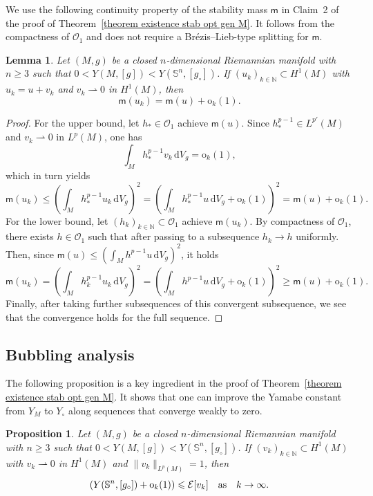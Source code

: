 \documentclass[reqno,11pt]{amsart}
\numberwithin{equation}{section}
\newtheorem{lemma}[theorem]{Lemma}
\newtheorem{proposition}[theorem]{Proposition}
\theoremstyle{definition}
\theoremstyle{remark}
\newcommand{\ud}{\,\mathrm{d}}
\newcommand{\Ss}{\mathbb{S}}
\begin{document}
We use the following continuity property of the stability mass $\mathsf{m}$ in Claim~2 of the proof of Theorem~\ref{theorem existence stab opt gen M}. It follows from the compactness of $\mathscr{O}_1$ and does not require a Br\'ezis--Lieb-type splitting for $\mathsf{m}$.

\begin{lemma}
\label{lemma m continuity}
Let $(M,g)$ be a closed $n$-dimensional Riemannian manifold with $n \geqslant 3$ 
such that $0 < Y(M,[g]) < Y(\Ss^n,[g_\circ])$.
If $(u_k)_{k \in \mathbb{N}} \subset H^1(M)$ with $u_k = u + v_k$
and $v_k \rightharpoonup 0$ in $H^1(M)$, then
\[
\mathsf{m}(u_k) = \mathsf{m}(u) + \mathrm{o}_k(1).
\]
\end{lemma}

\begin{proof}
For the upper bound, let $h_* \in \mathscr{O}_1$ achieve $\mathsf{m}(u)$. Since $h_*^{p-1} 
\in L^{p'}(M)$ and $v_k \rightharpoonup 0$ in $L^p(M)$, one has 
\[
\int_M h_*^{p-1} v_k \ud V_g =\mathrm{o}_k(1), 
\]
which in turn yields
\[
\mathsf{m}(u_k) \leqslant \left(\int_M h_*^{p-1} u_k \ud V_g\right)^2 = \left(\int_M h_*^{p-1} u 
\ud V_g + \mathrm{o}_k(1)\right)^2 = \mathsf{m}(u) + \mathrm{o}_k(1).
\]
For the lower bound, let $(h_k)_{k \in \mathbb{N}} \subset \mathscr{O}_1$ achieve 
$\mathsf{m}(u_k)$. By compactness of $\mathscr{O}_1$, there exists $h \in \mathscr{O}_1$ 
such that after passing to a subsequence $h_k \to h$ uniformly. Then, since $\mathsf{m}(u) \leqslant (\int_M h^{p-1} u \ud V_g)^2$, it holds
\[
\mathsf{m}(u_k) = \left(\int_M h_k^{p-1} u_k \ud V_g\right)^2 = \left(\int_M h^{p-1} u 
\ud V_g + \mathrm{o}_k(1)\right)^2 \geqslant \mathsf{m}(u) + \mathrm{o}_k(1).
\]
Finally, after taking further 
subsequences of this convergent subsequence, we see that  
the convergence holds for the full sequence.
\end{proof}

\subsection{Bubbling analysis}
The following proposition is a key ingredient in the proof of Theorem~\ref{theorem existence stab opt gen M}. It shows that one can improve the Yamabe constant from $Y_M$ to $Y_\circ$ along sequences that converge weakly to zero.

\begin{proposition}
\label{proposition Sobolev for bubbles}
Let $(M,g)$ be a closed $n$-dimensional Riemannian manifold with $n \geqslant 3$ 
such that $0 < Y(M,[g]) < Y(\Ss^n,[g_\circ])$.
If $(v_k)_{k \in \mathbb{N}} \subset H^1(M)$ with $v_k \rightharpoonup 0$ in $H^1(M)$ and $\|v_k\|_{L^p(M)} = 1$, then
\[
(Y(\Ss^n,[g_\circ]) + \mathrm{o}_k(1))  \leqslant \mathcal E[v_k] \quad {\rm as} \quad k \to \infty.
\]
\end{proposition}
\end{document}
